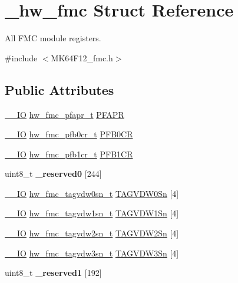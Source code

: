 \hypertarget{struct__hw__fmc}{}\section{\+\_\+hw\+\_\+fmc Struct Reference}
\label{struct__hw__fmc}


All F\+MC module registers.  




{\ttfamily \#include $<$M\+K64\+F12\+\_\+fmc.\+h$>$}

\subsection*{Public Attributes}
\begin{DoxyCompactItemize}
\item 
\hyperlink{core__sc300_8h_aec43007d9998a0a0e01faede4133d6be}{\+\_\+\+\_\+\+IO} \hyperlink{union__hw__fmc__pfapr}{hw\+\_\+fmc\+\_\+pfapr\+\_\+t} \hyperlink{struct__hw__fmc_a56e94a71c330fefdb1a95c0b5b46a1c8}{P\+F\+A\+PR}
\item 
\hyperlink{core__sc300_8h_aec43007d9998a0a0e01faede4133d6be}{\+\_\+\+\_\+\+IO} \hyperlink{union__hw__fmc__pfb0cr}{hw\+\_\+fmc\+\_\+pfb0cr\+\_\+t} \hyperlink{struct__hw__fmc_a54b5771fb74053daa08f3359ea870c2f}{P\+F\+B0\+CR}
\item 
\hyperlink{core__sc300_8h_aec43007d9998a0a0e01faede4133d6be}{\+\_\+\+\_\+\+IO} \hyperlink{union__hw__fmc__pfb1cr}{hw\+\_\+fmc\+\_\+pfb1cr\+\_\+t} \hyperlink{struct__hw__fmc_acd2b2fd6e65268ca154dc686660f28f5}{P\+F\+B1\+CR}
\item 
uint8\+\_\+t {\bfseries \+\_\+reserved0} \mbox{[}244\mbox{]}\hypertarget{struct__hw__fmc_a652f30f7a39a07c2c9fce6e95163834b}{}\label{struct__hw__fmc_a652f30f7a39a07c2c9fce6e95163834b}

\item 
\hyperlink{core__sc300_8h_aec43007d9998a0a0e01faede4133d6be}{\+\_\+\+\_\+\+IO} \hyperlink{union__hw__fmc__tagvdw0sn}{hw\+\_\+fmc\+\_\+tagvdw0sn\+\_\+t} \hyperlink{struct__hw__fmc_a67ddf2e91d7bffa40488d682e5141067}{T\+A\+G\+V\+D\+W0\+Sn} \mbox{[}4\mbox{]}
\item 
\hyperlink{core__sc300_8h_aec43007d9998a0a0e01faede4133d6be}{\+\_\+\+\_\+\+IO} \hyperlink{union__hw__fmc__tagvdw1sn}{hw\+\_\+fmc\+\_\+tagvdw1sn\+\_\+t} \hyperlink{struct__hw__fmc_a7e0c09b38761014ad55d3022e0d9290b}{T\+A\+G\+V\+D\+W1\+Sn} \mbox{[}4\mbox{]}
\item 
\hyperlink{core__sc300_8h_aec43007d9998a0a0e01faede4133d6be}{\+\_\+\+\_\+\+IO} \hyperlink{union__hw__fmc__tagvdw2sn}{hw\+\_\+fmc\+\_\+tagvdw2sn\+\_\+t} \hyperlink{struct__hw__fmc_ab87d5a7204023e87264737d1ecbc6ace}{T\+A\+G\+V\+D\+W2\+Sn} \mbox{[}4\mbox{]}
\item 
\hyperlink{core__sc300_8h_aec43007d9998a0a0e01faede4133d6be}{\+\_\+\+\_\+\+IO} \hyperlink{union__hw__fmc__tagvdw3sn}{hw\+\_\+fmc\+\_\+tagvdw3sn\+\_\+t} \hyperlink{struct__hw__fmc_ae29b98f76cea13b247a66b6b016db8fc}{T\+A\+G\+V\+D\+W3\+Sn} \mbox{[}4\mbox{]}
\item 
uint8\+\_\+t {\bfseries \+\_\+reserved1} \mbox{[}192\mbox{]}\hypertarget{struct__hw__fmc_a61c61807881305acf491b33cb970443a}{}\label{struct__hw__fmc_a61c61807881305acf491b33cb970443a}


\end{DoxyCompactItemize}
